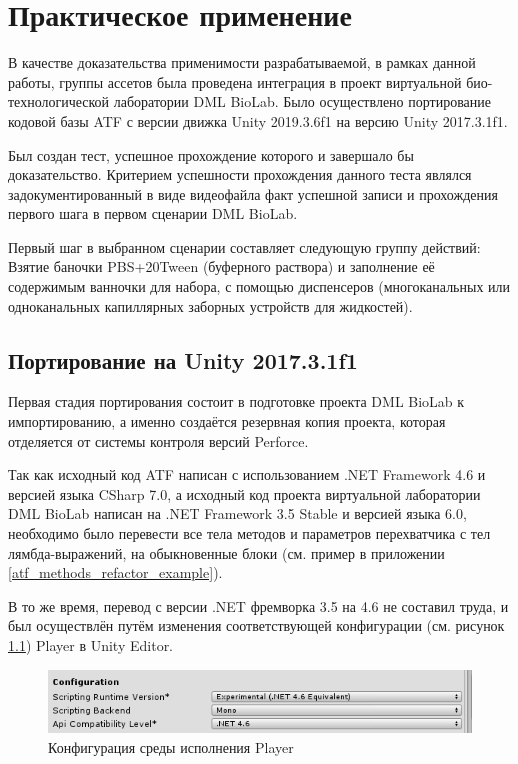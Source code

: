 \chapter{Практическое применение}
В качестве доказательства применимости разрабатываемой, в рамках данной работы, группы ассетов была проведена интеграция в проект виртуальной био-технологической лаборатории DML BioLab. Было осуществлено портирование кодовой базы ATF с версии движка Unity 2019.3.6f1 на версию Unity 2017.3.1f1. 

Был создан тест, успешное прохождение которого и завершало бы доказательство. Критерием успешности прохождения данного теста являлся задокументированный в виде видеофайла факт успешной записи и прохождения первого шага в первом сценарии DML BioLab.

Первый шаг в выбранном сценарии составляет следующую группу действий: Взятие баночки PBS+20Tween (буферного раствора) и заполнение её содержимым ванночки для набора, с помощью диспенсеров (многоканальных или одноканальных капиллярных заборных устройств для жидкостей). 

\section{Портирование на Unity 2017.3.1f1}
Первая стадия портирования состоит в подготовке проекта DML BioLab к импортированию, а именно создаётся резервная копия проекта, которая отделяется от системы контроля версий Perforce.

Так как исходный код ATF написан с использованием .NET Framework 4.6 и версией языка CSharp 7.0, а исходный код проекта виртуальной лаборатории DML BioLab написан на .NET Framework 3.5 Stable и версией языка 6.0, необходимо было перевести все тела методов и параметров перехватчика с тел лямбда-выражений, на обыкновенные блоки (см. пример в приложении \ref{atf_methods_refactor_example}).

В то же время, перевод с версии .NET фремворка 3.5 на 4.6 не составил труда, и был осуществлён путём изменения соответствующей конфигурации (см. рисунок \ref{player_conf}) Player в Unity Editor.

\begin{figure}[H]
	\centering
	\includegraphics[width=\linewidth]{player_config.png}
	\caption{Конфигурация среды исполнения Player}
	\label{player_conf}
\end{figure}

